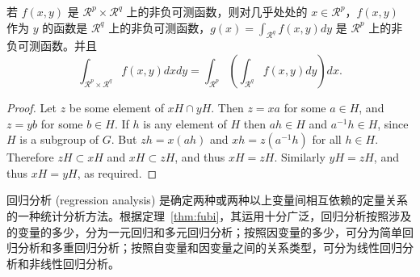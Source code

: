 \begin{theorem}[Fubini 定理]\label{thm:fubi}
若 $f(x,y)$ 是 $\mathcal{R}^p\times\mathcal{R}^q$ 上的非负可测函数，则对几乎处处的 $x\in \mathcal{R}^p$，$f(x,y)$ 作为 $y$ 的函数是 $\mathcal{R}^q$ 上的非负可测函数，$g(x)=\int_{\mathcal{R}^q}f(x,y) dy$ 是 $\mathcal{R}^p$ 上的非负可测函数。并且
\begin{equation}\label{eq:461}
  \int_{\mathcal{R}^p\times\mathcal{R}^q} f(x,y) dxdy=\int_{\mathcal{R}^p}\left(\int_{\mathcal{R}^q}f(x,y)dy\right)dx.
\end{equation}
\end{theorem}

\begin{proof}
Let $z$ be some element of $xH \cap yH$.  Then $z = xa$ for some $a \in H$, and $z = yb$ for some $b \in H$. If $h$ is any element of $H$ then $ah \in H$ and $a^{-1}h \in H$, since $H$ is a subgroup of $G$. But $zh = x(ah)$ and $xh = z(a^{-1}h)$ for all $h \in H$. Therefore $zH \subset xH$ and $xH \subset zH$, and thus $xH = zH$.  Similarly $yH = zH$, and thus $xH = yH$, as required.
\end{proof}

回归分析 (regression analysis) 是确定两种或两种以上变量间相互依赖的定量关系的一种统计分析方法。根据定理~\ref{thm:fubi}，其运用十分广泛，回归分析按照涉及的变量的多少，分为一元回归和多元回归分析；按照因变量的多少，可分为简单回归分析和多重回归分析；按照自变量和因变量之间的关系类型，可分为线性回归分析和非线性回归分析。


